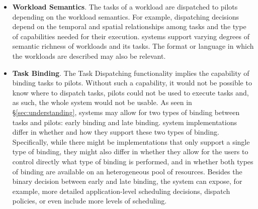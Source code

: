 \documentclass{sig-alternate}
\begin{document}
\begin{itemize}
\item \textbf{Workload Semantics}. The tasks of a workload are dispatched to
  pilots depending on the workload semantics. For example, dispatching decisions
  depend on the temporal and spatial relationships among tasks and the type of
  capabilities needed for their execution. \pilot systems support varying
  degrees of semantic richness of workloads and its tasks. The
  format or language in which the workloads are described may also be relevant.




\item \textbf{Task Binding}. The Task Dispatching functionality implies the
  capability of binding tasks to pilots. Without such a capability, it would
  not be possible to know where to dispatch tasks, pilots could not be used to
  execute tasks and, as such, the whole \pilot system would not be usable. As
  seen in \S\ref{sec:understanding}, \pilot systems may allow for two types of
  binding between tasks and pilots: early binding and late binding. \pilot
  system implementations differ in whether and how they support these two types
  of binding. Specifically, while there might be implementations that only
  support a single type of binding, they might also differ in whether they allow
  for the users to control directly what type of binding is performed, and in
  whether both types of binding are available on an heterogeneous pool of
  resources. Besides the binary decision between early and late binding, the
  \pilot system can expose, for example, more detailed application-level
  scheduling decisions, dispatch policies, or even include more levels of
  scheduling.


\end{itemize}
\end{document}
